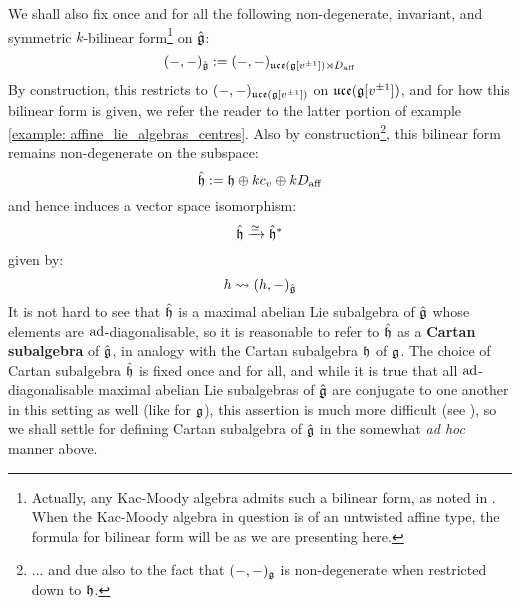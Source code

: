         We shall also fix once and for all the following non-degenerate, invariant, and symmetric $k$-bilinear form\footnote{Actually, any Kac-Moody algebra admits such a bilinear form, as noted in \cite[Chapter 2]{kac_infinite_dimensional_lie_algebras}. When the Kac-Moody algebra in question is of an untwisted affine type, the formula for bilinear form will be as we are presenting here.} on $\hat{\mathfrak{g}}$:
            $$(-, -)_{\hat{\mathfrak{g}}} := (-, -)_{\mathfrak{uce}(\mathfrak{g}[v^{\pm 1}]) \rtimes D_{\mathrm{aff}}}$$
        By construction, this restricts to $(-, -)_{\mathfrak{uce}(\mathfrak{g}[v^{\pm 1}])}$ on $\mathfrak{uce}(\mathfrak{g}[v^{\pm 1}])$, and for how this bilinear form is given, we refer the reader to the latter portion of example \ref{example: affine_lie_algebras_centres}. Also by construction\footnote{... and due also to the fact that $(-, -)_{\mathfrak{g}}$ is non-degenerate when restricted down to $\mathfrak{h}$.}, this bilinear form remains non-degenerate on the subspace:
            $$\hat{\mathfrak{h}} := \mathfrak{h} \oplus k c_v \oplus k D_{\mathrm{aff}}$$
        and hence induces a vector space isomorphism:
            $$\hat{\mathfrak{h}} \xrightarrow[]{\simeq} \hat{\mathfrak{h}}^*$$
        given by:
            $$h \leadsto (h, -)_{\hat{\mathfrak{g}}}$$
        It is not hard to see that $\hat{\mathfrak{h}}$ is a maximal abelian Lie subalgebra of $\hat{\mathfrak{g}}$ whose elements are $\mathrm{ad}$-diagonalisable, so it is reasonable to refer to $\hat{\mathfrak{h}}$ as a \textbf{Cartan subalgebra} of $\hat{\mathfrak{g}}$, in analogy with the Cartan subalgebra $\mathfrak{h}$ of $\mathfrak{g}$. The choice of Cartan subalgebra $\hat{\mathfrak{h}}$ is fixed once and for all, and while it is true that all $\mathrm{ad}$-diagonalisable maximal abelian Lie subalgebras of $\hat{\mathfrak{g}}$ are conjugate to one another in this setting as well (like for $\mathfrak{g}$), this assertion is much more difficult (see \cite{kac_peterson_infinite_flag_varieties_and_conjugacy_of_cartan_subalgebras}), so we shall settle for defining  Cartan subalgebra of $\hat{\mathfrak{g}}$ in the somewhat \textit{ad hoc} manner above.
        
